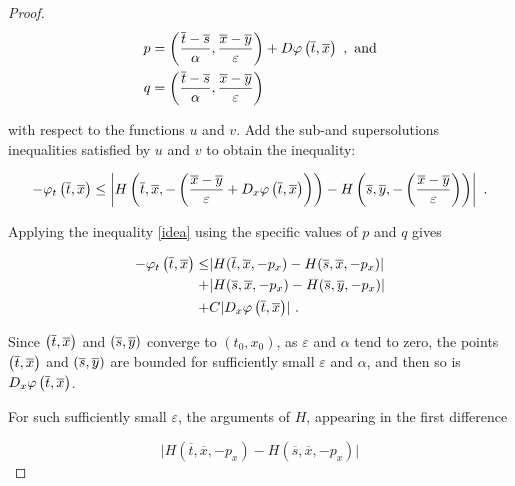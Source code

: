 \begin{theorem}
\begin{proof}
		  		\begin{align*}
		  				p &= \left( \frac{\overline{t} - \overline{s}}{\alpha}, \frac{\overline{x} - \overline{y}}{\varepsilon} \right) + D\varphi\left(\overline{t}, \overline{x}\right) \ , \text{ and} \\
		  			q &= \left( \frac{\overline{t} - \overline{s}}{\alpha}, \frac{\overline{x} - \overline{y}}{\varepsilon} \right)
		  		\end{align*}
		  		
		  		with respect to the functions $ u $ and $ v. $ Add the sub-and supersolutions inequalities satisfied by $ u $ and $ v $ to obtain the inequality:
		  		
		  		\begin{equation*}
		  			- \varphi_t\left(\overline{t}, \overline{x}\right) 
		  			\leq \left\lvert H \left( \overline{t}, \overline{x}, - \left( \frac{\overline{x} - \overline{y}}{\varepsilon} + D_x \varphi\left(\overline{t}, \overline{x}\right) \right)  \right)
		  			- H \left( \overline{s}, \overline{y}, - \left( \frac{\overline{x} - \overline{y}}{\varepsilon} \right) \right) \right\rvert \ .
		  		\end{equation*}
		  		
		  		Applying the inequality \eqref{idea} using the specific values of $ p $ and $ q $ gives
		  		
		  		\begin{equation}
		  		\label{final step}
		  			\begin{split}
		  				- \varphi_t\left(\overline{t}, \overline{x}\right) \leq
		  				&\lvert H(\overline{t}, \overline{x}, -p_x) - H(\overline{s}, \overline{x}, -p_x) \rvert \\
		  				+&\lvert H(\overline{s}, \overline{x}, -p_x) - H(\overline{s}, \overline{y}, -p_x) \rvert \\
		  				+& C \lvert D_x \varphi\left(\overline{t}, \overline{x}\right) \rvert \ .
		  			\end{split}
		  		\end{equation}
		  		
		  		Since $ \left(\overline{t}, \overline{x}\right) $ and $ \left(\overline{s}, \overline{y}\right) $ converge to $ (t_0, x_0) $, as $ \varepsilon $ and $ \alpha $ tend to zero, the points $ \left(\overline{t}, \overline{x}\right) $ and $ \left(\overline{s}, \overline{y}\right) $ are bounded for sufficiently small $ \varepsilon $ and $ \alpha $, and then so is $ D_x \varphi\left(\overline{t}, \overline{x}\right) $.
		  		
		  		For such sufficiently small $ \varepsilon $, the arguments of $ H $, appearing in the first difference 
		  		
		  		\begin{equation*}
		  			\lvert H(\overline{t}, \overline{x}, -p_x) - H(\overline{s}, \overline{x}, -p_x) \rvert 
		  		\end{equation*}
		  		

\end{proof}
\end{theorem}
